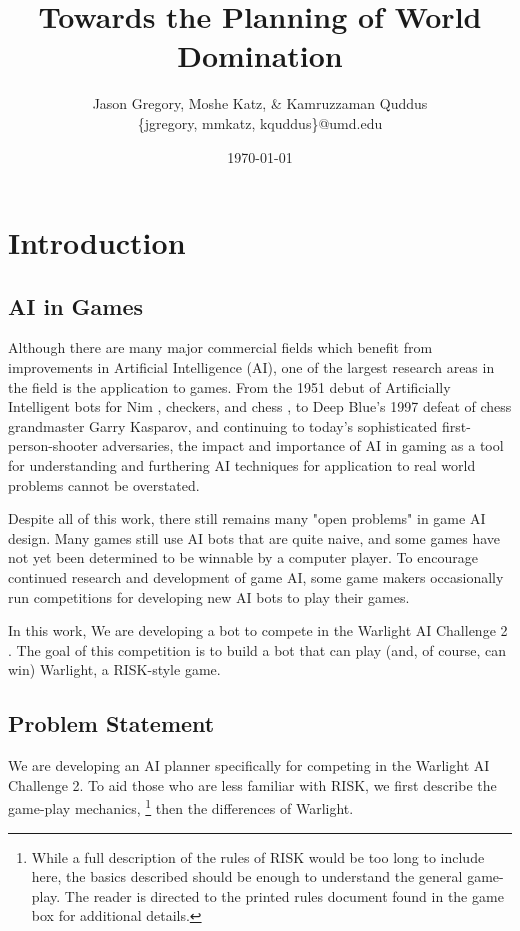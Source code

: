 \documentclass[a4paper,11pt]{article}
\begin{document}
\title{Towards the Planning of World Domination}
\author{Jason Gregory, Moshe Katz, \& Kamruzzaman Quddus \\ \{jgregory, mmkatz, kquddus\}@umd.edu}
\date{\today}

\maketitle

%

\section{Introduction}\label{sec:intro}
\subsection{AI in Games}\label{aiingames}
Although there are many major commercial fields which benefit from improvements
in Artificial Intelligence (AI), one of the largest research areas in the field is
the application to games.  From the 1951 debut of Artificially Intelligent bots
for Nim \cite{nim}, checkers, and chess \cite{checkerschess}, to Deep Blue's 1997
defeat of chess grandmaster Garry Kasparov, and continuing to today's sophisticated
first-person-shooter adversaries, the impact and importance of AI in gaming as a
tool for understanding and furthering AI techniques for application to real world 
problems cannot be overstated.

Despite all of this work, there still remains many "open problems" in game AI
design.  Many games still use AI bots that are quite naive, and some games have
not yet been determined to be winnable by a computer player. To encourage continued
research and development of game AI, some game makers occasionally run competitions
for developing new AI bots to play their games.

In this work, We are developing a bot to compete in the Warlight AI Challenge 2 \cite{warlight}.
The goal of this competition is to build a bot that can play (and, of course, can
win) Warlight, a RISK-style game.

\subsection{Problem Statement}\label{sec:problem}
We are developing an AI planner specifically for competing in the Warlight AI Challenge 2.  
To aid those who are less familiar with RISK, we first describe the game-play mechanics,
\footnote{While a full description of the rules of RISK would be too long to 
include here, the basics described should be enough to understand the general 
game-play.  The reader is directed to the printed rules document found in the game 
box for additional details.} then the differences of Warlight.
\end{document}
